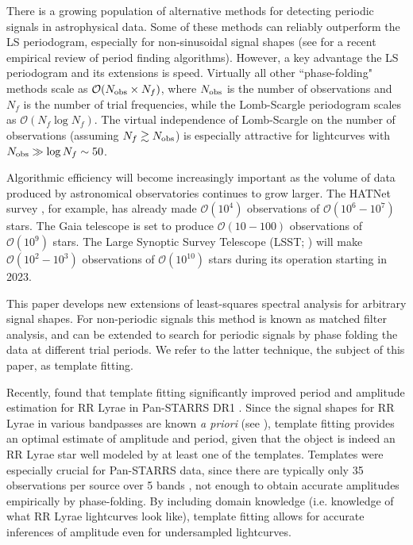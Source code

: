 \documentclass[apj]{emulateapj}
\newcommand{\bigO}{\mathcal{O}}
\begin{document}
There is a growing population of alternative methods for detecting
periodic signals in astrophysical data. Some of these methods can reliably
outperform the LS periodogram, especially for non-sinusoidal signal shapes
(see \cite{Graham_etal_2013} for a recent empirical review of period finding algorithms). 
However, a key advantage the LS periodogram and its extensions is speed.
Virtually all other ``phase-folding" methods scale as $\bigO(N_{\rm obs}\times N_f)$, where $N_{\rm obs}$ is the number
of observations and $N_f$ is the number of trial frequencies, while the Lomb-Scargle
periodogram scales as $\bigO(N_f\log N_f)$. The virtual independence of Lomb-Scargle on the number
of observations (assuming $N_f \gtrsim N_{\rm obs}$) is especially attractive for lightcurves
with $N_{\rm obs} \gg \log N_f \sim 50$. 

Algorithmic efficiency will become increasingly important as the volume
of data produced by astronomical observatories continues to grow larger. The HATNet survey 
\citep{HATNet}, for example, has already made $\bigO(10^4)$ observations of 
$\bigO(10^6-10^7)$ stars. The Gaia telescope \citep{GAIA} is set to produce $\bigO(10-100)$ 
observations of $\bigO(10^9)$ stars. The Large Synoptic Survey Telescope (LSST; \cite{LSST}) 
will make $\bigO(10^2-10^3)$ observations of $\bigO(10^{10})$ stars during its operation starting in 2023.

This paper develops new extensions of least-squares spectral analysis for arbitrary
signal shapes. For non-periodic signals this method is known as matched filter analysis,
and can be extended to search for periodic signals by phase folding the data
at different trial periods. We refer to the latter technique, the subject of this paper, as
template fitting. 

Recently, \cite{Sesar_etal_2016} found that template fitting significantly improved
period and amplitude estimation for RR Lyrae in Pan-STARRS DR1 \citep{PanSTARRS}. Since the signal
shapes for RR Lyrae in various bandpasses are known \emph{a priori} (see \cite{Sesar_etal_2010}), 
template fitting provides an optimal estimate of amplitude and period,
given that the object is indeed an RR Lyrae star well modeled by at least one of the templates. 
Templates were especially crucial for Pan-STARRS data, since there are typically only 
35 observations per source over 5 bands \citep{Hernitschek_etal_2016}, not enough to obtain 
accurate amplitudes empirically by phase-folding. By including domain knowledge (i.e. knowledge of what RR Lyrae 
lightcurves look like), template fitting allows for accurate inferences of amplitude even 
for undersampled lightcurves.
\end{document}
